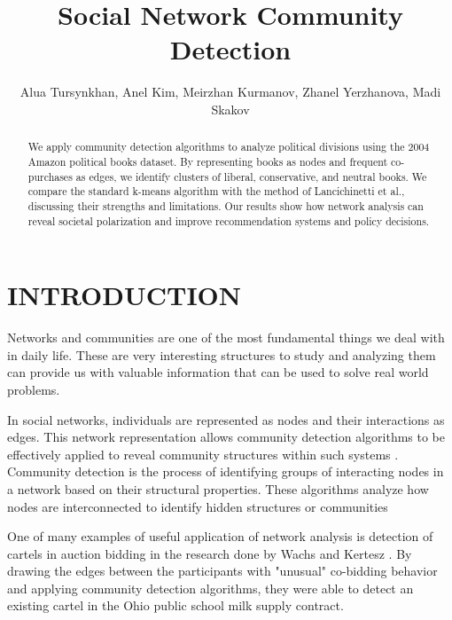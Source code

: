 \documentclass[conference]{IEEEtran}
\begin{document}
\title{\LARGE Social Network Community Detection} 
\author{Alua Tursynkhan, Anel Kim, Meirzhan Kurmanov, Zhanel Yerzhanova, Madi Skakov}


\maketitle


\begin{abstract}
    We apply community detection algorithms to analyze political divisions using the 2004 Amazon political books dataset. By representing books as nodes and frequent co-purchases as edges, we identify clusters of liberal, conservative, and neutral books. We compare the standard k-means algorithm with the method of Lancichinetti et al., discussing their strengths and limitations. Our results show how network analysis can reveal societal polarization and improve recommendation systems and policy decisions.
\end{abstract}


\section{INTRODUCTION}

Networks and communities are one of the most fundamental things we deal with in daily life. These are very interesting structures to study and analyzing them can provide us with valuable information that can be used to solve real world problems.

In social networks, individuals are represented as nodes and their interactions as edges. This network representation allows community detection algorithms to be effectively applied to reveal community structures within such systems \cite{malode2025comparative}. Community detection is the process of identifying groups of interacting nodes in a network based on their structural properties. These algorithms analyze how nodes are interconnected to identify hidden structures or communities \cite{Li2016CDAB}

One of many examples of useful application of network analysis is detection of cartels in auction bidding in the research done by Wachs and Kertesz \cite{wachs2019network}. By drawing the edges between the participants with "unusual" co-bidding behavior and applying community detection algorithms, they were able to detect an existing cartel in the Ohio public school milk supply contract.
\end{document}
